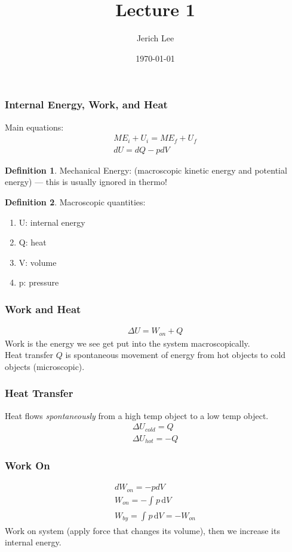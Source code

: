 \documentclass[12pt]{article}
\title{Lecture 1}
\author{Jerich Lee}
\date{\today}
\theoremstyle{definition} %
\newtheorem{definition}{Definition}
\theoremstyle{plain} %
\begin{document}
\maketitle
\subsubsection*{Internal Energy, Work, and Heat}
Main equations:
\begin{align}
    ME_i + U_i = ME_f + U_f \\[10pt] 
    dU = dQ-pdV
\end{align}

\begin{definition}
   Mechanical Energy: (macroscopic kinetic energy and potential energy) — this is usually ignored in thermo!
\end{definition}
\begin{definition}
    Macroscopic quantities:
   \noindent
   \begin{enumerate}
    \item U: internal energy
    \item Q: heat
    \item V: volume
    \item p: pressure
   \end{enumerate} 
   
\end{definition}
\subsubsection*{Work and Heat}
\begin{align}
    \Delta U = W_{on} + Q
\end{align}
Work is the energy we see get put into the system macroscopically. \\
Heat transfer $Q$ is spontaneous movement of energy from hot objects to cold objects (microscopic).

\subsubsection*{Heat Transfer}
Heat flows \emph{spontaneously} from a high temp object to a low temp object.
\begin{align}
    \Delta U_{cold} = Q \\[10pt] 
    \Delta U_{hot} = -Q
\end{align}
\subsubsection*{Work On}
\begin{align}
    dW_{on} = -pdV \\[10pt] 
    W_{on} = -\int_{}^{} p \,\mathrm{d}V \\[10pt] 
    W_{by} = \int_{}^{} p \,\mathrm{d}V = -W_{on} 
\end{align}
Work on system (apply force that changes its volume), then we increase its internal energy.
\end{document}

